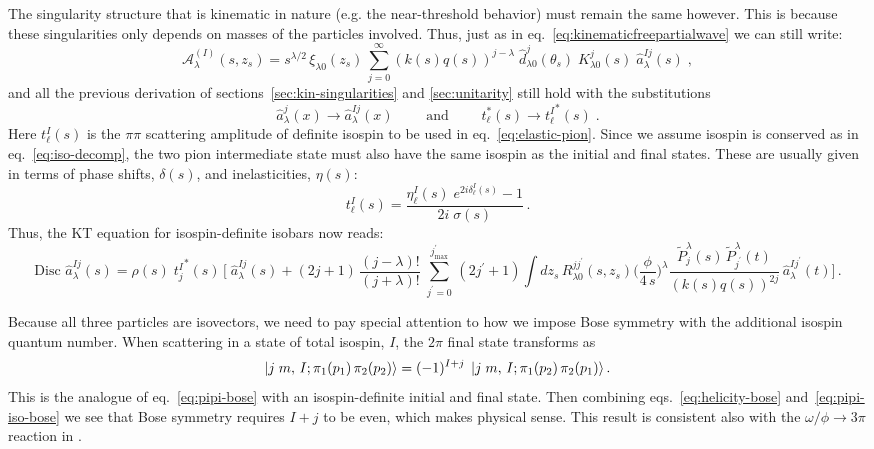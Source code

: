 \documentclass[10pt, aps,prd,amsmath,amssymb,superscriptaddress,onecolumn,
nofootinbib,showpacs,preprintnumbers]{revtex4-1}
\newcommand{\mand}{\qquad \text{ and } \qquad}
\newcommand{\jpmax}{{j^\prime_\text{max}}}
\newcommand{\Disc}{\text{Disc }}
\begin{document}
 The singularity structure that is kinematic in nature (e.g. the near-threshold behavior) must remain the same however. This is because these singularities only depends on masses of the particles involved. Thus, just as in eq.~\ref{eq:kinematicfreepartialwave} we can still write:
    \begin{equation}
      \label{eq:model-iso-helicity}
      \mathcal{A}^{(I)}_\lambda(s,z_s) = s^{\lambda/2} \, \xi_{\lambda0}(z_s) \, \sum_{j=0}^\infty (k(s)q(s))^{j-\lambda} \; \hat{d}^j_{\lambda0}(\theta_s) \;  K^j_{\lambda0}(s) \; \hat{a}^{Ij}_{\lambda}(s)
      \; ,
    \end{equation}
and all the previous derivation of sections~\ref{sec:kin-singularities} and \ref{sec:unitarity} still hold with the substitutions
  \begin{equation}
    \hat{a}^j_\lambda(x) \rightarrow \hat{a}^{Ij}_{\lambda}(x)
    \mand
    t^*_\ell(s) \rightarrow {t^I_{\ell}}^*(s) \; .
  \end{equation}
Here \(t^I_{\ell}(s)\) is the \(\pi\pi\) scattering amplitude of definite isospin to be used in eq.~\ref{eq:elastic-pion}. Since we assume isospin is conserved as in eq.~\ref{eq:iso-decomp}, the two pion intermediate state must also have the same isospin as the initial and final states. These are usually given in terms of phase shifts, \(\delta(s)\), and inelasticities, \(\eta(s)\):
  \begin{equation}
    t^{I}_{\ell}(s) = \frac{\eta^I_\ell(s) \; e^{2i \delta^I_\ell(s)} -1}{2i \; \sigma(s)} \,.
  \end{equation}
Thus, the KT equation for isospin-definite isobars now reads:
  \begin{equation}
    \label{eq:final-kt-isospin}
    \Disc \hat{a}^{Ij}_{\lambda}(s) = \rho(s) \; {t^I_{j}}^*(s) \, \bigg[ \; \hat{a}^{Ij}_{\lambda}(s) +  (2j+1) \, \frac{(j-\lambda)!}{(j+\lambda)!} \;  \sum_{j^\prime = 0}^\jpmax \, (2j^\prime+1)
    \int dz_s \, R^{jj^\prime}_{\lambda0}(s,z_s) \bigg(\frac{\phi}{4 \, s}\bigg)^\lambda \frac{\tilde{P}^\lambda_j(s) \, \tilde{P}_{j^\prime}^\lambda(t)}{(k(s)q(s))^{2j}} \, \hat{a}^{Ij^\prime}_{\lambda}(t) \bigg]
    \,.
  \end{equation}

Because all three particles are isovectors, we need to pay special attention to how we impose Bose symmetry with the additional isospin quantum number. When scattering in a state of total isospin, \(I\), the \(2\pi\) final state transforms as
  \begin{equation}
    \label{eq:pipi-iso-bose}
    \ket{j \; m, \, I; \pi_1(p_1) \, \pi_2(p_2)} = (-1)^{I+j} \; \ket{j \; m, \, I; \pi_1(p_2) \, \pi_2(p_1)}.
  \end{equation}
This is the analogue of eq.~\ref{eq:pipi-bose} with an isospin-definite initial and final state.
Then combining eqs.~\ref{eq:helicity-bose} and~\ref{eq:pipi-iso-bose} we see that Bose symmetry requires \(I + j\) to be even, which makes physical sense. This result is consistent also with the \(\omega/\phi \to 3\pi\) reaction in \cite{Danilkin:2014cra,Niecknig:2012sj}.
\end{document}
